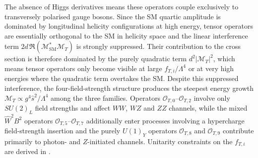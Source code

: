 The absence of Higgs derivatives means these operators couple exclusively to transversely polarised gauge bosons. Since the SM quartic amplitude is dominated by longitudinal helicity configurations at high energy, tensor operators are essentially orthogonal to the SM in helicity space and the linear interference term $2d\,\Re(\mathcal{M}_{\mathrm{SM}}^{*}\mathcal{M}_{T})$ is strongly suppressed. Their contribution to the cross section is therefore dominated by the purely quadratic term $d^{2}|\mathcal{M}_{T}|^{2}$, which means tensor operators only become visible at large $f_{T,i}/\Lambda^4$ or at very high energies where the quadratic term overtakes the SM. Despite this suppressed interference, the four-field-strength structure produces the steepest energy growth $\mathcal{M}_T\propto g^4\hat{s}^2/\Lambda^4$ among the three families. Operators $\mathcal{O}_{T,0}$--$\mathcal{O}_{T,2}$ involve only $SU(2)_L$ field strengths and affect $WW$, $WZ$ and $ZZ$ channels, while the mixed $\hat{W}^2B^2$ operators $\mathcal{O}_{T,5}$--$\mathcal{O}_{T,7}$ additionally enter processes involving a hypercharge field-strength insertion and the purely $U(1)_Y$ operators $\mathcal{O}_{T,8}$ and $\mathcal{O}_{T,9}$ contribute primarily to photon- and $Z$-initiated channels. Unitarity constraints on the $f_{T,i}$ are derived in \cite{PhysRevD.101.113003}.